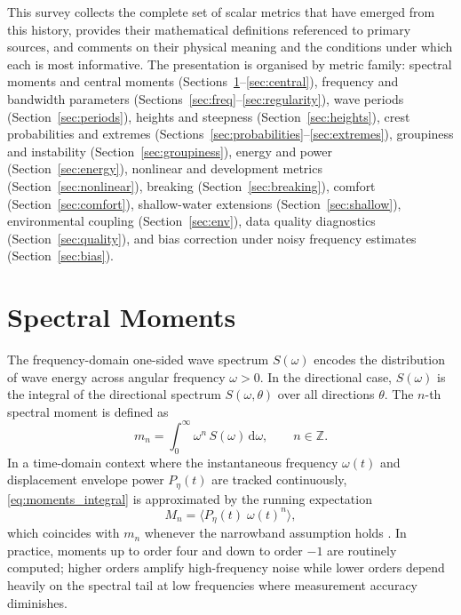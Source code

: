 \documentclass[journal]{IEEEtran}
\begin{document}
    This survey collects the complete set of scalar metrics that have emerged
    from this history, provides their mathematical definitions referenced to
    primary sources, and comments on their physical meaning and the
    conditions under which each is most informative.
    The presentation is organised by metric family: spectral moments and
    central moments (Sections~\ref{sec:moments}--\ref{sec:central}),
    frequency and bandwidth parameters
    (Sections~\ref{sec:freq}--\ref{sec:regularity}), wave periods
    (Section~\ref{sec:periods}), heights and steepness
    (Section~\ref{sec:heights}), crest probabilities and extremes
    (Sections~\ref{sec:probabilities}--\ref{sec:extremes}), groupiness
    and instability (Section~\ref{sec:groupiness}), energy and power
    (Section~\ref{sec:energy}), nonlinear and development metrics
    (Section~\ref{sec:nonlinear}), breaking (Section~\ref{sec:breaking}),
    comfort (Section~\ref{sec:comfort}), shallow-water extensions
    (Section~\ref{sec:shallow}), environmental coupling
    (Section~\ref{sec:env}), data quality diagnostics
    (Section~\ref{sec:quality}), and bias correction under noisy
    frequency estimates (Section~\ref{sec:bias}).

    \section{Spectral Moments}
    \label{sec:moments}

    The frequency-domain one-sided wave spectrum $S(\omega)$ encodes the
    distribution of wave energy across angular frequency $\omega > 0$.
    In the directional case, $S(\omega)$ is the integral of the directional
    spectrum $S(\omega,\theta)$ over all directions $\theta$.
    The $n$-th spectral moment is defined as
    \begin{equation}
        m_n = \int_0^\infty \omega^n\,S(\omega)\,\mathrm{d}\omega,
        \qquad n \in \mathbb{Z}.
        \label{eq:moments_integral}
    \end{equation}
    In a time-domain context where the instantaneous frequency $\omega(t)$
    and displacement envelope power $P_\eta(t)$ are tracked continuously,
    \eqref{eq:moments_integral} is approximated by the running expectation
    \begin{equation}
        M_n = \bigl\langle P_\eta(t)\;\omega(t)^n \bigr\rangle,
        \label{eq:moments_running}
    \end{equation}
    which coincides with $m_n$ whenever the narrowband assumption holds
    \cite{Ochi1998}.
    In practice, moments up to order four and down to order $-1$ are
    routinely computed; higher orders amplify high-frequency noise
    while lower orders depend heavily on the spectral tail at low
    frequencies where measurement accuracy diminishes.
\end{document}
